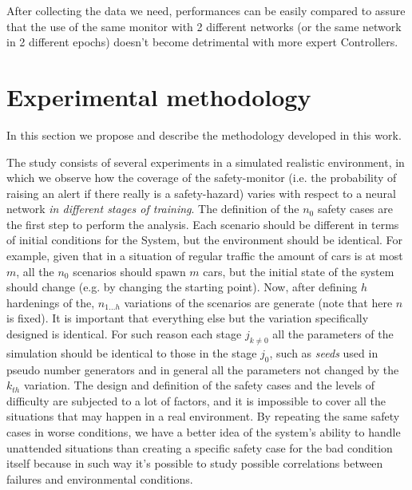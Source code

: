 After collecting the data we need, performances can be easily compared to assure that the use of the same monitor with 2 different networks (or the same network in 2 different epochs) doesn't become detrimental with more expert Controllers.

\section{Experimental methodology}

In this section we propose and describe the methodology developed in this work.\newline

The study consists of several experiments in a simulated realistic environment, in which we observe how the coverage of the safety-monitor (i.e. the probability of raising an alert if there really is a safety-hazard) varies with respect to a neural network \textsl{in different stages of training}.\newline
The definition of the $n_{0}$ safety cases are the first step to perform the analysis. Each scenario should be different in terms of initial conditions for the System, but the environment should be identical. For example, given that in a situation of regular traffic the amount of cars is at most $m$, all the $n_{0}$ scenarios should spawn $m$ cars, but the initial state of the system should change (e.g. by changing the starting point). Now, after defining $h$ hardenings of the, $n_{1\dots h}$ variations of the scenarios are generate (note that here $n$ is fixed). It is important that everything else but the variation specifically designed is identical. For such reason each stage $j_{k\neq 0}$ all the parameters of the simulation should be identical to those in the stage $j_{0}$, such as \textsl{seeds} used in pseudo number generators and in general all the parameters not changed by the $k_{th}$ variation.\newline
The design and definition of the safety cases and the levels of difficulty are subjected to a lot of factors, and it is impossible to cover all the situations that may happen in a real environment. By repeating the same safety cases in worse conditions, we have a better idea of the system's ability to handle unattended situations than creating a specific safety case for the bad condition itself because in such way it's possible to study possible correlations between failures and environmental conditions.\newline\newline
\newpage


